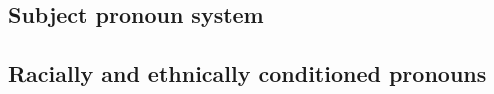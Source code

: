     \subsection{Subject pronoun system}
    \subsection{Racially and ethnically conditioned pronouns} %
